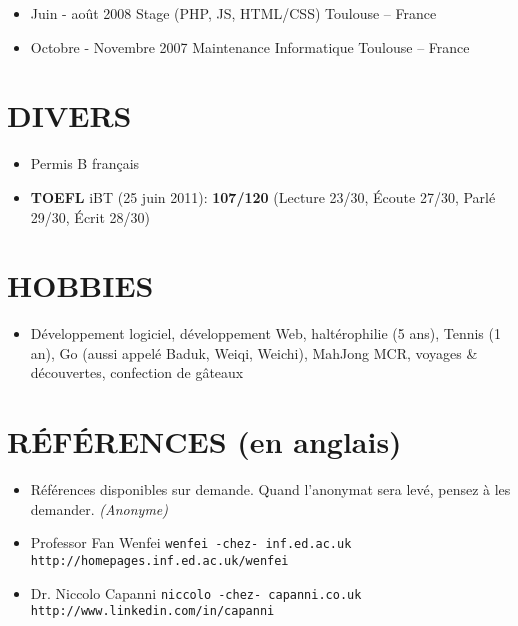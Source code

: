 \documentclass{res}
\begin{document}
\begin{resume}
\begin{itemize}
		\item[] Juin - ao\^ut 2008 \tabto{5cm} Stage (PHP, JS, HTML/CSS) \hfill Toulouse -- France
		\item[] Octobre - Novembre 2007 \tabto{5cm} Maintenance Informatique \hfill Toulouse -- France
	\end{itemize}
		
\section{DIVERS}  
	\begin{itemize}
		\item[] Permis B fran\c{c}ais
		\item[] \textbf{TOEFL} iBT (25 juin 2011): \textbf{107/120} (Lecture 23/30, \'Ecoute 27/30, Parl\'e 29/30, \'Ecrit 28/30)		
		    \end{itemize} 
 
\section{HOBBIES}         
	\begin{itemize}
		\item[] D\'eveloppement logiciel, d\'eveloppement Web, halt\'erophilie (5 ans), Tennis (1 an), Go (aussi appel\'e Baduk, Weiqi, Weichi), MahJong MCR, voyages \& d\'ecouvertes, confection de g\^ateaux
	\end{itemize}

\section{R\'EF\'ERENCES (en anglais)}
\ifisanon 
    \begin{itemize}
			\item[] R\'ef\'erences disponibles sur demande. Quand l'anonymat sera lev\'e, pensez \`a les demander. \textit{(Anonyme)}
    \end{itemize}
\else
		\begin{itemize}
			\item[] Professor Fan Wenfei \tabto{4cm} \texttt{wenfei -chez- inf.ed.ac.uk} \hfill \texttt{http://homepages.inf.ed.ac.uk/wenfei}
			\item[] Dr. Niccolo Capanni \tabto{4cm} \texttt{niccolo -chez- capanni.co.uk} \hfill \texttt{http://www.linkedin.com/in/capanni}
		\end{itemize}
\fi
\end{resume}
\end{document}
